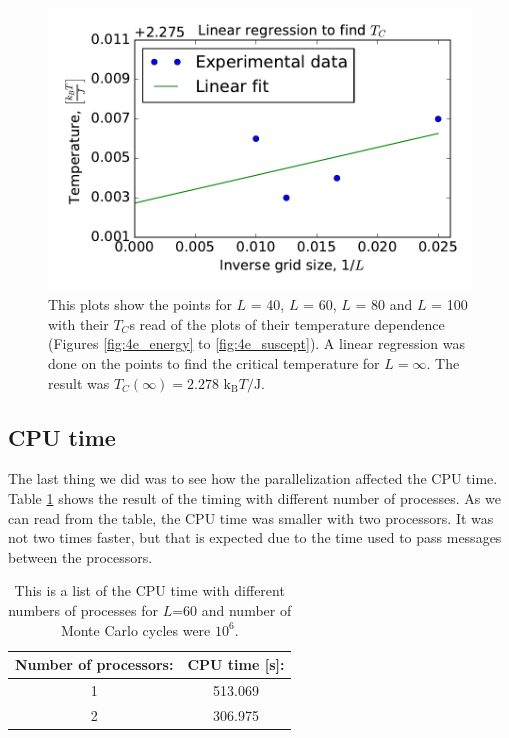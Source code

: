 \begin{figure}[H]
\includegraphics[width=\linewidth]{../results/4e/linfit}\caption{This plots show the points for $L$ = 40, $L$ = 60, $L$ = 80 and $L$ = 100 with their $T_C$s read of the plots of their temperature dependence (Figures \ref{fig:4e_energy} to \ref{fig:4e_suscept}). A linear regression was done on the points to find the critical temperature for $L = \infty$. The result was $T_C(\infty) = 2.278$ $\text{k}_\text{B}T/\text{J}$. }\label{fig:linfit}
\end{figure}

\subsection{CPU time}

The last thing we did was to see how the parallelization affected the CPU time. Table \ref{tab:CPU} shows the result of the timing with different number of processes. As we can read from the table, the CPU time was smaller with two processors. It was not two times faster, but that is expected due to the time used to pass messages between the processors.

\begin{table}[H]\caption{This is a list of the CPU time with different numbers of processes for $L$=60 and number of Monte Carlo cycles were $10^6$.}\label{tab:CPU}
\begin{tabular}{cc}
Number of processors:& CPU time [s]: \\ \hline
 1 & 513.069\\
 2 & 306.975\\
\end{tabular}
\end{table}